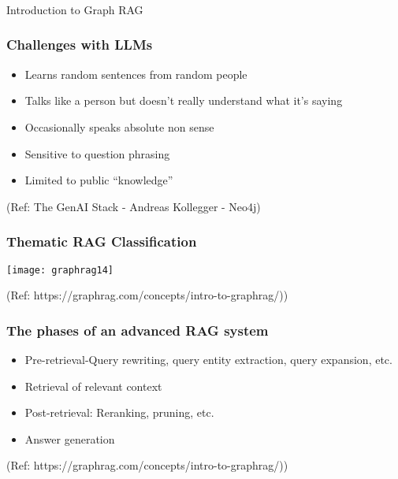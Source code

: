 \begin{frame}[fragile]\frametitle{}
\begin{center}
{\Large Introduction to Graph RAG}
\end{center}
\end{frame}

\begin{frame}[fragile]\frametitle{Challenges with LLMs}
    \begin{itemize}
        \item Learns random sentences from random people
        \item Talks like a person but doesn't really understand what it's saying
        \item Occasionally speaks absolute non sense
        \item Sensitive to question phrasing
        \item Limited to public ``knowledge''
    \end{itemize}
	
	{\tiny (Ref: The GenAI Stack - Andreas Kollegger - Neo4j)}
	
\end{frame}

\begin{frame}[fragile]\frametitle{Thematic RAG Classification}

	\begin{center}
	\texttt{[image: graphrag14]}
	\end{center}
	
		{\tiny (Ref: https://graphrag.com/concepts/intro-to-graphrag/))}

	
\end{frame}

\begin{frame}[fragile]\frametitle{The phases of an advanced RAG system}
    \begin{itemize}
        \item Pre-retrieval-Query rewriting, query entity extraction, query expansion, etc.
        \item Retrieval of relevant context
        \item Post-retrieval: Reranking, pruning, etc.
        \item Answer generation
    \end{itemize}
	
		{\tiny (Ref: https://graphrag.com/concepts/intro-to-graphrag/))}
	
\end{frame}


